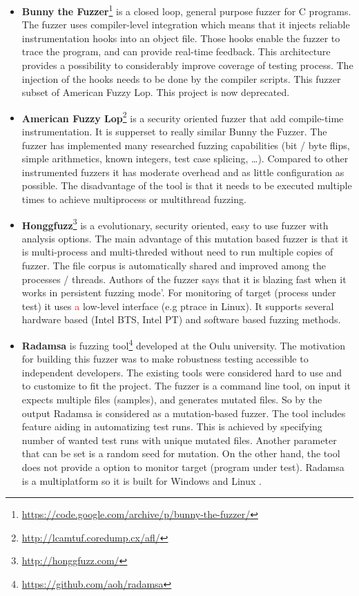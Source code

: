\begin{itemize}

	\item \textbf{Bunny the Fuzzer}\footnote{\url{https://code.google.com/archive/p/bunny-the-fuzzer/}} is a closed loop, general purpose fuzzer for C programs.
	The fuzzer uses compiler-level integration which means that it injects reliable instrumentation hooks into an object file.
	Those hooks enable the fuzzer to trace the program, and can provide real-time feedback. This architecture provides a possibility
	to considerably improve coverage of testing process. The injection of the hooks
	needs to be done by the compiler scripts.
	This fuzzer subset of American Fuzzy Lop. This project is now deprecated.

	\item \textbf{American Fuzzy Lop}\footnote{\url{http://lcamtuf.coredump.cx/afl/}}
	is a security oriented fuzzer that add compile-time instrumentation. It is
	supperset to really similar Bunny the Fuzzer. The fuzzer has implemented many
	researched fuzzing capabilities (bit / byte flips,  simple arithmetics, known
	integers, test case splicing, \ldots). Compared to other instrumented fuzzers it
	has moderate overhead and as little configuration as possible. The disadvantage
	of the tool is that it needs to be executed multiple times to achieve
	multiprocess or multithread fuzzing.

	\item \textbf{Honggfuzz}\footnote{\url{http://honggfuzz.com/}} is a evolutionary, security oriented, easy to use fuzzer with analysis options.
	The main advantage of this mutation based fuzzer is that it is multi-process and multi-threded without need to run multiple copies of fuzzer.
	The file corpus is automatically shared and improved among the processes / threads.
	Authors of the fuzzer says that it is blazing fast when it works in persistent fuzzing mode'.
	For monitoring of target (process under test) it uses {\textcolor{red}{a}} low-level interface (e.g ptrace in Linux).
	It supports several hardware based (Intel BTS, Intel PT) and software based fuzzing methods.

	\item \textbf{Radamsa} is fuzzing tool\footnote{\url{https://github.com/aoh/radamsa}} developed at the Oulu university.
	The motivation for building this fuzzer was to make robustness testing accessible to independent developers.
	The existing tools were considered hard to use and to customize to fit the project.
	The fuzzer is a command line tool, on input it expects multiple files (samples), and generates mutated files.
	So by the output Radamsa is considered as a mutation-based fuzzer.
	The tool includes feature aiding in automatizing test runs.
	This is achieved by specifying number of wanted test runs with unique mutated files.
	Another parameter that can be set is a random seed for mutation.
	On the other hand, the tool does not provide a option to monitor target (program under test).
	Radamsa is a multiplatform so it is built for Windows and Linux \cite{radamsaThesis}.


\end{itemize}
